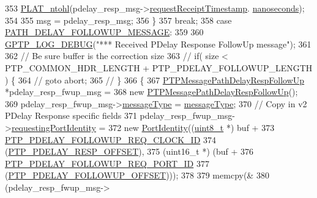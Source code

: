 \begin{DoxyCode}
{{{{{{{{353                 \hyperlink{linux_2src_2platform_8cpp_ad335681c3444e0406899693a6f782173}{PLAT\_ntohl}(pdelay\_resp\_msg->\hyperlink{class_p_t_p_message_path_delay_resp_a981c3fe148ecddf9f1091675650ccd48}{requestReceiptTimestamp}.
      \hyperlink{class_timestamp_a78ae11d98fcfe738239d0a853d82c84a}{nanoseconds});
354 
355             msg = pdelay\_resp\_msg;
356         \}
357         \textcolor{keywordflow}{break};
358     \textcolor{keywordflow}{case} \hyperlink{avbts__message_8hpp_ac6606ebe91c8ac66a2c314c79f5ab013adda4323fc121fba997bb5aa704a9dde8}{PATH\_DELAY\_FOLLOWUP\_MESSAGE}:
359 
360         \hyperlink{gptp__log_8hpp_ae4c6efe7c9cf6d7d3bbd28a0fd087d61}{GPTP\_LOG\_DEBUG}(\textcolor{stringliteral}{"*** Received PDelay Response FollowUp message"});
361 
362         \textcolor{comment}{// Be sure buffer is the correction size}
363 \textcolor{comment}{//     if( size < PTP\_COMMON\_HDR\_LENGTH + PTP\_PDELAY\_FOLLOWUP\_LENGTH ) \{}
364 \textcolor{comment}{//       goto abort;}
365 \textcolor{comment}{//     \}}
366         \{
367             \hyperlink{class_p_t_p_message_path_delay_resp_follow_up}{PTPMessagePathDelayRespFollowUp} *pdelay\_resp\_fwup\_msg =
368                 \textcolor{keyword}{new} \hyperlink{class_p_t_p_message_path_delay_resp_follow_up_a7cb7ccac2ccd9bcc0174d78f910566bb}{PTPMessagePathDelayRespFollowUp}();
369             pdelay\_resp\_fwup\_msg->\hyperlink{class_p_t_p_message_common_adb32627aa5b0e2dbad3ccd88aab07c05}{messageType} = \hyperlink{class_p_t_p_message_common_adb32627aa5b0e2dbad3ccd88aab07c05}{messageType};
370             \textcolor{comment}{// Copy in v2 PDelay Response specific fields}
371             pdelay\_resp\_fwup\_msg->\hyperlink{class_p_t_p_message_path_delay_resp_follow_up_a27e69c7fb521ebffca13229a7c4658ce}{requestingPortIdentity} =
372                 \textcolor{keyword}{new} \hyperlink{class_port_identity}{PortIdentity}((\hyperlink{stdint_8h_aba7bc1797add20fe3efdf37ced1182c5}{uint8\_t} *) buf +
373                          \hyperlink{avbts__message_8hpp_a888c4d23c6d7221b962cdb21af1c9919}{PTP\_PDELAY\_FOLLOWUP\_REQ\_CLOCK\_ID}
374                          (\hyperlink{avbts__message_8hpp_a7c20f0e32d4408c124fa9e115ab32cf3}{PTP\_PDELAY\_RESP\_OFFSET}),
375                          (uint16\_t *) (buf +
376                                \hyperlink{avbts__message_8hpp_a255d563aa29bae40a58b1855d33155fc}{PTP\_PDELAY\_FOLLOWUP\_REQ\_PORT\_ID}
377                                (\hyperlink{avbts__message_8hpp_af0f41aa83b1011ea5b8c42abddd8cd50}{PTP\_PDELAY\_FOLLOWUP\_OFFSET})));
378 
379             memcpy(&
380                    (pdelay\_resp\_fwup\_msg->
}}}}}}}}
\end{DoxyCode}
